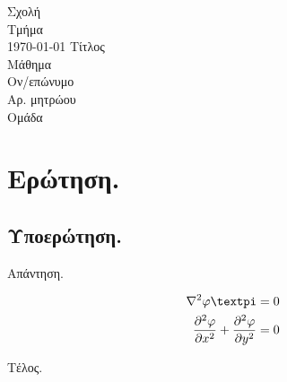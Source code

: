 \documentclass[11pt,a4paper]{article}
\providecommand*{\pd}[3][]{\frac{\partial^{#1}#2}{\partial #3^{#1}}}
\begin{document}
\renewcommand{\thesubsection}{{}(\alph{subsection})}

\makeatletter
\renewrobustcmd{\anw@true}{\let\ifanw@\iftrue}
\renewrobustcmd{\anw@false}{\let\ifanw@\iffalse}\anw@false
\newrobustcmd{\noanw@true}{\let\ifnoanw@\iftrue}
\newrobustcmd{\noanw@false}{\let\ifnoanw@\iffalse}\noanw@false
\renewrobustcmd{\anw@print}{\ifanw@\ifnoanw@\else\numer@lsign\fi\fi}
\newrobustcmd{\noanw}{\noanw@true}
\makeatother


\addto\captionsgreek{
	\renewcommand{\figurename}{Διάγραμμα}
    \renewcommand{\bibname}{Βιβλιογραφία}
    \renewcommand{\refname}{Βιβλιογραφία}
}

\begin{titlepage}
\centering
Σχολή \\
Τμήμα \\
\today
\vfill
\vfill
{\huge Τίτλος \\}
{\Large Μάθημα \\}
\vfill
Ον/επώνυμο \\
Αρ. μητρώου \\
Ομάδα
\vfill
\vfill
\end{titlepage}


\section{Ερώτηση.}

\subsection{Υποερώτηση.}

Απάντηση.

\begin{align*}
    \displaystyle %
    \nabla^2\varphi \textpi                 &= 0 \\
    \pd[2]{\varphi}{x} + \pd[2]{\varphi}{y} &= 0
\end{align*}

Τέλος.
\end{document}

